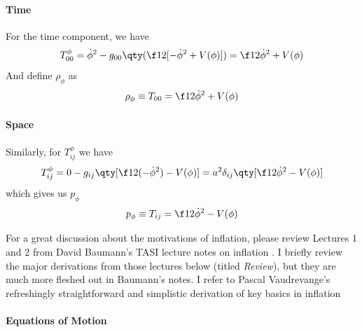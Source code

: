 \paragraph{Time}

For the time component, we have
\begin{equation}
    T_{00}^\phi=\Dot{\phi}^2-g_{00}\qty(\f12[-\dot{\phi}^2+V(\phi)])=\f12 \dot{\phi}^2+V(\phi)
\end{equation}
And define $\rho_\phi$ as
\begin{equation}
    \rho_\phi\equiv T_{00}=\f12 \dot{\phi}^2+V(\phi)
\end{equation}

\paragraph{Space}
Similarly, for $T^\phi_{ij}$ we have
\begin{equation}
    T^\phi_{ij}=0-g_{ij}\qty[\f12(-\dot{\phi}^2)-V(\phi)]=a^2\delta_{ij}\qty[\f12 \dot{\phi}^2-V(\phi)]
\end{equation}
which gives us $p_\phi$
\begin{equation}
    p_\phi\equiv T_{ij}=\f12 \dot{\phi}^2-V(\phi)
\end{equation}




For a great discussion about the motivations of inflation, please review Lectures 1 and 2 from David Baumann's TASI lecture notes on inflation . I briefly review the major derivations from those lectures below (titled \textit{Review}), but they are much more fleshed out in Baumann's notes. I refer to Pascal Vaudrevange's \cite{Vaudrevange2010} refreshingly straightforward and simplistic derivation of key basics in inflation 


\paragraph{Equations of Motion}


